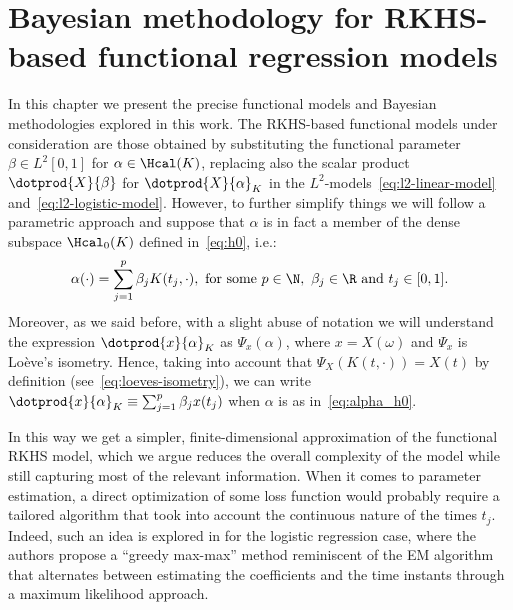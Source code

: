 %
%

\let\epsilon\varepsilon

\chapter{Bayesian methodology for RKHS-based functional regression models}\label{ch:bayesian}

In this chapter we present the precise functional models and Bayesian methodologies explored in this work. The RKHS-based functional models under consideration \citep[see][]{berrendero2018functional, berrendero2019rkhs} are those obtained by substituting the functional parameter \(\beta\in L^2[0,1]\) for \(\alpha \in \Hcal(K)\), replacing also the scalar product \(\dotprod{X}{\beta}\) for \(\dotprod{X}{\alpha}_K\) in the \(L^2\)-models~\eqref{eq:l2-linear-model} and~\eqref{eq:l2-logistic-model}. However, to further simplify things we will follow a parametric approach and suppose that \(\alpha\) is in fact a member of the dense subspace \(\Hcal_0(K)\) defined in~\eqref{eq:h0}, i.e.:
\begin{equation}\label{eq:alpha_h0}
\alpha(\cdot) = \sum_{j=1}^p \beta_j K(t_j, \cdot), \text{ for some } p \in \N, \ \beta_j \in \R \text{ and } t_j \in [0,1].
\end{equation}
Moreover, as we said before, with a slight abuse of notation we will understand the expression \(\dotprod{x}{\alpha}_K\) as \(\Psi_x(\alpha)\), where \(x=X(\omega)\) and \(\Psi_x\) is Loève's isometry. Hence, taking into account that \(\Psi_X(K(t, \cdot)) = X(t)\) by definition (see~\eqref{eq:loeves-isometry}), we can write \(\dotprod{x}{\alpha}_K \equiv \sum_{j=1}^p \beta_j x(t_j)\) when \(\alpha\) is as in~\eqref{eq:alpha_h0}.

In this way we get a simpler, finite-dimensional approximation of the functional RKHS model, which we argue reduces the overall complexity of the model while still capturing most of the relevant information. When it comes to parameter estimation, a direct optimization of some loss function would probably require a tailored algorithm that took into account the continuous nature of the times \(t_j\). Indeed, such an idea is explored in \citet{berrendero2018functional} for the logistic regression case, where the authors propose a ``greedy max-max'' method reminiscent of the EM algorithm that alternates between estimating the coefficients and the time instants through a maximum likelihood approach.

